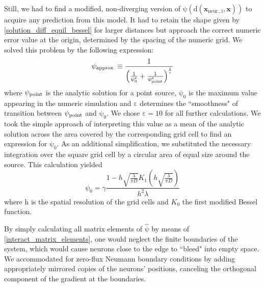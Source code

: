 \documentclass[10pt,letterpaper]{article}
\begin{document}
Still, we had to find a modified, non-diverging version of $\mathrm{\psi (d(\mathbf{x}_{\mathrm{neur.},i},\mathbf{x}))}$ to acquire any prediction from this model. It had to retain the shape given by \eqref{solution_diff_equil_bessel} for larger distances but approach the correct numeric error value at the origin, determined by the spacing of the numeric grid. We solved this problem by the following expression:
\begin{equation}
\psi_{\rm approx.} \equiv \frac{1}{\left(\frac{1}{\psi_0^\varepsilon} + \frac{1}{\psi_{\rm point}^\varepsilon}\right)^{\frac{1}{\varepsilon}}}
\label{Numeric_Solution_Expression_Trick}
\end{equation}
where $\psi_{\rm point}$ is the analytic solution for a point source, $\mathrm{\psi_0}$ is the maximum value appearing in the numeric simulation and $\mathrm{\varepsilon}$ determines the ``smoothness" of transition between $\psi_{\rm point}$ and $\mathrm{\psi_0}$. We chose $\mathrm{\varepsilon=10}$ for all further calculations. We took the simple approach of interpreting this value as a mean of the analytic solution across the area covered by the corresponding grid cell to find an expression for $\mathrm{\psi_0}$. As an additional simplification, we substituted the necessary integration over the square grid cell by a circular area of equal size around the source. This calculation yielded
\begin{equation}
\psi_0 = \gamma \frac{1-h\sqrt{\frac{\lambda}{\pi D}} K_1\left( h\sqrt{\frac{\lambda}{\pi D}}\right) }{h^2 \lambda}
\label{Numeric_Grid_Bessel_Approx}
\end{equation}
where $\mathrm{h}$ is the spatial resolution of the grid cells and $K_0$ the first modified Bessel function.

By simply calculating all matrix elements of $\mathrm{\hat{\psi}}$ by means of \eqref{interact_matrix_elements}, one would neglect the finite boundaries of the system, which would cause neurons close to the edge to ``bleed" into empty space. We accommodated for zero-flux Neumann boundary conditions by adding appropriately mirrored copies of the neurons' positions, canceling the orthogonal component of the gradient at the boundaries. 
\end{document}
